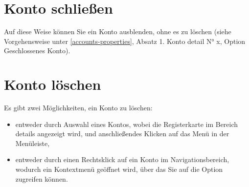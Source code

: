 \section{Konto schließen\label{accounts-closure}}%

Auf diese Weise können Sie ein Konto ausblenden, ohne es zu löschen (siehe Vorgehensweise unter \vref{accounts-properties}, Absatz {1. Konto detail N° x}, Option {Geschlossenes Konto}).


\section{Konto löschen\label{accounts-delete}}%

Es gibt zwei Möglichkeiten, ein Konto zu löschen:
\begin{itemize}
	\item entweder durch Auswahl eines Kontos, wobei die Registerkarte  im Bereich details angezeigt wird, und anschließendes Klicken auf das Menü  in der Menüleiste,
	\item entweder durch einen Rechtsklick auf ein Konto im Navigationsbereich, wodurch ein Kontextmenü geöffnet wird, über das Sie auf die Option  zugreifen können.
\end{itemize}

